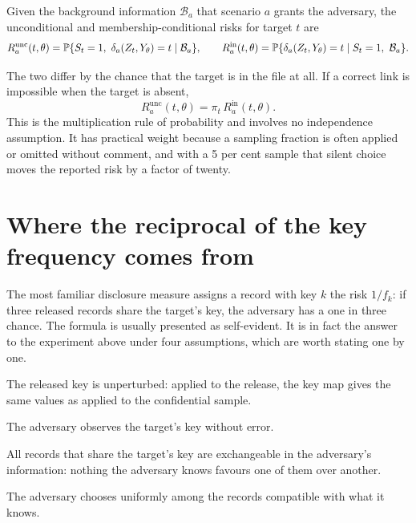 \begin{definition}\label{def:risk}
Given the background information $\mathcal{B}_a$ that scenario $a$ grants the
adversary, the unconditional and membership-conditional risks for target $t$ are
\begin{equation}\label{eq:tworisks}
R^{\mathrm{unc}}_a(t,\theta) = \mathbb{P}\{S_t = 1,\ \delta_a(Z_t,Y_\theta) = t \mid \mathcal{B}_a\},
\qquad
R^{\mathrm{in}}_a(t,\theta) = \mathbb{P}\{\delta_a(Z_t,Y_\theta) = t \mid S_t = 1,\ \mathcal{B}_a\}.
\end{equation}
\end{definition}

The two differ by the chance that the target is in the file at all. If a correct
link is impossible when the target is absent,
\begin{equation}\label{eq:factor}
R^{\mathrm{unc}}_a(t,\theta) = \pi_t\, R^{\mathrm{in}}_a(t,\theta).
\end{equation}
This is the multiplication rule of probability and involves no independence
assumption. It has practical weight because a sampling fraction is often applied
or omitted without comment, and with a 5 per cent sample that silent choice moves
the reported risk by a factor of twenty.

\section{Where the reciprocal of the key frequency comes from}

The most familiar disclosure measure assigns a record with key $k$ the risk
$1/f_k$: if three released records share the target's key, the adversary has a one
in three chance. The formula is usually presented as self-evident. It is in fact
the answer to the experiment above under four assumptions, which are worth stating
one by one.

\begin{assumption}\label{as:key}
The released key is unperturbed: applied to the release, the key map gives the
same values as applied to the confidential sample.
\end{assumption}
\begin{assumption}\label{as:obs}
The adversary observes the target's key without error.
\end{assumption}
\begin{assumption}\label{as:exch}
All records that share the target's key are exchangeable in the adversary's
information: nothing the adversary knows favours one of them over another.
\end{assumption}
\begin{assumption}\label{as:unif}
The adversary chooses uniformly among the records compatible with what it knows.
\end{assumption}

